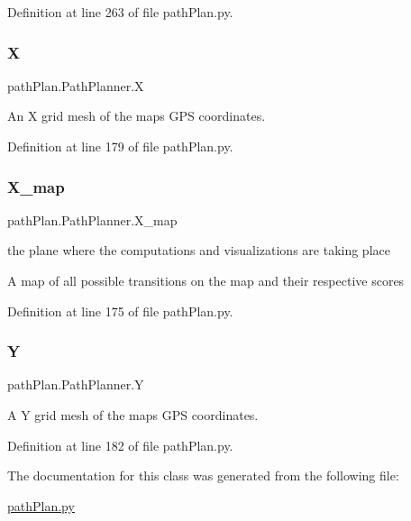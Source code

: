 Definition at line 263 of file path\+Plan.\+py.

\mbox{\label{classpath_plan_1_1_path_planner_ac7e6ed6310bc8e1064e42af17b8a5948}} 
\subsubsection{\texorpdfstring{X}{X}}
{\footnotesize\ttfamily path\+Plan.\+Path\+Planner.\+X}



An X grid mesh of the map\textquotesingle{}s \textquotesingle{}G\+PS\textquotesingle{} coordinates. 



Definition at line 179 of file path\+Plan.\+py.

\mbox{\label{classpath_plan_1_1_path_planner_a726f4b4f55f7fb557eabceb962e25871}} 
\subsubsection{\texorpdfstring{X\+\_\+map}{X\_map}}
{\footnotesize\ttfamily path\+Plan.\+Path\+Planner.\+X\+\_\+map}



the plane where the computations and visualizations are taking place 

A map of all possible transitions on the map and their respective scores 

Definition at line 175 of file path\+Plan.\+py.

\mbox{\label{classpath_plan_1_1_path_planner_a4e78ffd0fb9df91a15d01ca5cb615d24}} 
\subsubsection{\texorpdfstring{Y}{Y}}
{\footnotesize\ttfamily path\+Plan.\+Path\+Planner.\+Y}



A Y grid mesh of the map\textquotesingle{}s \textquotesingle{}G\+PS\textquotesingle{} coordinates. 



Definition at line 182 of file path\+Plan.\+py.



The documentation for this class was generated from the following file\+:\begin{DoxyCompactItemize}
\item 
\mbox{\hyperlink{path_plan_8py}{path\+Plan.\+py}}\end{DoxyCompactItemize}
